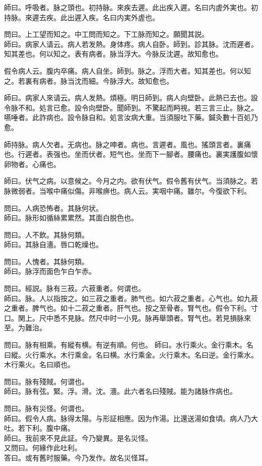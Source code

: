 \documentclass[12pt,twoside,UTF8,b5paper]{ctexbook}
\begin{document}
師曰。呼吸者。脉之頭也。初持脉。來疾去遲。此出疾入遲。名曰内虗外実也。初持脉。來遲去疾。此出遲入疾。名曰内実外虗也。

問曰。上工望而知之。中工問而知之。下工脉而知之。願聞其説。\\
師曰。病家人请云。病人若发熱。身体疼。病人自卧。師到。診其脉。沈而遲者。知其差也。何以知之。表有病者。脉当浮大。今脉反沈遲。故知愈也。

假令病人云。腹内卒痛。病人自坐。師到。脉之。浮而大者。知其差也。何以知之。若裏有病者。脉当沈而細。今脉浮大。故知愈也。

師曰。病家人來请云。病人发熱。煩極。明日師到。病人向壁卧。此熱已去也。設令脉不和。処言已愈。設令向壁卧。聞師到。不驚起而眄視。若三言三止。脉之。嚥唾者。此詐病也。設令脉自和。処言汝病大重。当須服吐下藥。鍼灸數十百処乃愈。

師持脉。病人欠者。无病也。脉之呻者。病也。言遲者。風也。搖頭言者。裏痛也。行遲者。表强也。坐而伏者。短气也。坐而下一腳者。腰痛也。裏実護腹如懷卵物者。心痛也。

師曰。伏气之病。以意候之。今月之内。欲有伏气。假令舊有伏气。当須脉之。若脉微弱者。当喉中痛似傷。非喉痹也。病人云。実咽中痛。雖尔。今復欲下利。

問曰。人病恐怖者。其脉何状。\\
師曰。脉形如循絲累累然。其面白脱色也。

問曰。人不飲。其脉何類。\\
師曰。其脉自濇。唇口乾燥也。

問曰。人愧者。其脉何類。\\
師曰。脉浮而面色乍白乍赤。

問曰。經説。脉有三菽。六菽重者。何谓也。\\
師曰。脉。人以指按之。如三菽之重者。肺气也。如六菽之重者。心气也。如九菽之重者。脾气也。如十二菽之重者。肝气也。按之至骨者。腎气也。假令下利。寸口。関上。尺中悉不見脉。然尺中时一小見。脉再舉頭者。腎气也。若見損脉來至。为難治。

問曰。脉有相乘。有縱有横。有逆有順。何也。
師曰。水行乘火。金行乘木。名曰縱。火行乘水。木行乘金。名曰横。水行乘金。火行乘木。名曰逆。金行乘水。木行乘火。名曰順也。

問曰。脉有殘賊。何谓也。\\
師曰。脉有弦。緊。浮。滑。沈。濇。此六者名曰殘賊。能为諸脉作病也。

問曰。脉有災怪。何谓也。\\
師曰。假令人病。脉得太陽。与形証相應。因为作湯。比還送湯如食頃。病人乃大吐。若下利。腹中痛。\\
師曰。我前來不見此証。今乃變異。是名災怪。\\
又問曰。何緣作此吐利。\\
答曰。或有舊时服藥。今乃发作。故名災怪耳。
\end{document}
